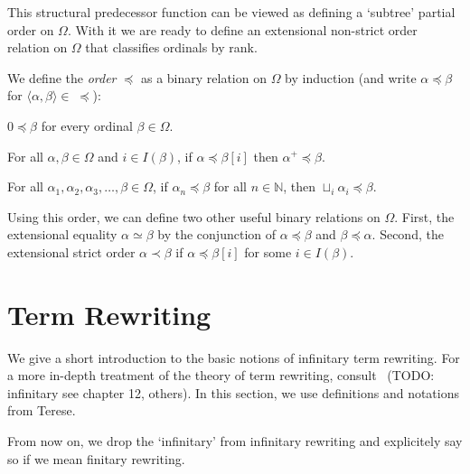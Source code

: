 
This structural predecessor function can be viewed as defining a `subtree'
partial order on $\Omega$. With it we are ready to define an extensional
non-strict order relation on $\Omega$ that classifies ordinals by rank.

\begin{definition}\label{def:order}%
We define the \emph{order} $\preceq$ as a binary relation on $\Omega$ by
induction (and write $\alpha \preceq \beta$ for $\langle \alpha, \beta \rangle
\in \; \preceq$):
\begin{compactenum}
  \item
    $0 \preceq \beta$ for every ordinal $\beta \in \Omega$.
  \item\label{def:order:succ}
    For all $\alpha, \beta \in \Omega$ and $i \in I(\beta)$, if $\alpha
    \preceq \beta[i]$ then $\alpha^+ \preceq \beta$.
  \item
    For all $\alpha_1, \alpha_2, \alpha_3, \ldots, \beta \in \Omega$, if
    $\alpha_n \preceq \beta$ for all $n \in \mathbb{N}$, then $\sqcup_i
    \alpha_i \preceq \beta$.
\end{compactenum}
\end{definition}

Using this order, we can define two other useful binary relations on
$\Omega$. First, the extensional equality $\alpha \simeq \beta$ by the
conjunction of $\alpha \preceq \beta$ and $\beta \preceq \alpha$. Second, the
extensional strict order $\alpha \prec \beta$ if $\alpha \preceq \beta[i]$ for
some $i \in I(\beta)$.


\section{Term Rewriting}\label{sec:rewriting}


We give a short introduction to the basic notions of infinitary term
rewriting. For a more in-depth treatment of the theory of term rewriting,
consult~\cite{terese-03} (TODO: infinitary see chapter 12, others). In this
section, we use definitions and notations from Terese.

From now on, we drop the `infinitary' from infinitary rewriting and
explicitely say so if we mean finitary rewriting.


